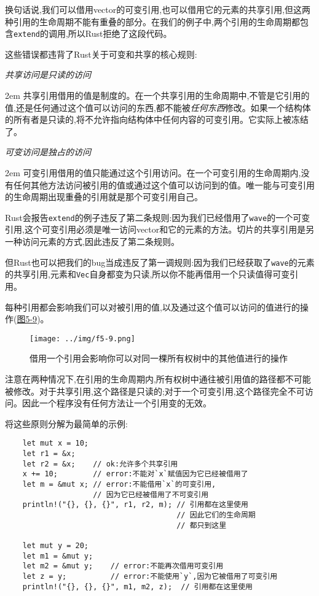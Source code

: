 换句话说,我们可以借用vector的可变引用,也可以借用它的元素的共享引用,但这两种引用的生命周期不能有重叠的部分。在我们的例子中,两个引用的生命周期都包含\texttt{extend}的调用,所以Rust拒绝了这段代码。

这些错误都违背了Rust关于可变和共享的核心规则:

\begin{flushleft}
    \emph{共享访问是只读的访问}
\end{flushleft}

\hangindent 2em
\noindent
共享引用借用的值是制度的。在一个共享引用的生命周期中,不管是它引用的值,还是任何通过这个值可以访问的东西,都不能被\emph{任何东西}修改。如果一个结构体的所有者是只读的,将不允许指向结构体中任何内容的可变引用。它实际上被冻结了。

\begin{flushleft}
    \emph{可变访问是独占的访问}
\end{flushleft}

\hangindent 2em
\noindent
可变引用借用的值只能通过这个引用访问。在一个可变引用的生命周期内,没有任何其他方法访问被引用的值或通过这个值可以访问到的值。唯一能与可变引用的生命周期出现重叠的引用就是那个可变引用自己。

Rust会报告\texttt{extend}的例子违反了第二条规则:因为我们已经借用了\texttt{wave}的一个可变引用,这个可变引用必须是唯一访问vector和它的元素的方法。切片的共享引用是另一种访问元素的方式,因此违反了第二条规则。

但Rust也可以把我们的bug当成违反了第一调规则:因为我们已经获取了\texttt{wave}的元素的共享引用,元素和\texttt{Vec}自身都变为只读,所以你不能再借用一个只读值得可变引用。

每种引用都会影响我们可以对被引用的值,以及通过这个值可以访问的值进行的操作(\hyperref[f5-9]{图5-9})。

\begin{figure}[htbp]
    \centering
    \texttt{[image: ../img/f5-9.png]}
    \caption{借用一个引用会影响你可以对同一棵所有权树中的其他值进行的操作}
    \label{f5-9}
\end{figure}

注意在两种情况下,在引用的生命周期内,所有权树中通往被引用值的路径都不可能被修改。对于共享引用,这个路径是只读的;对于一个可变引用,这个路径完全不可访问。因此一个程序没有任何方法让一个引用变的无效。

将这些原则分解为最简单的示例:
\begin{verbatim}
    let mut x = 10;
    let r1 = &x;
    let r2 = &x;    // ok:允许多个共享引用
    x += 10;        // error:不能对`x`赋值因为它已经被借用了
    let m = &mut x; // error:不能借用`x`的可变引用,
                    // 因为它已经被借用了不可变引用
    println!("{}, {}, {}", r1, r2, m); // 引用都在这里使用
                                       // 因此它们的生命周期
                                       // 都只到这里

    let mut y = 20;
    let m1 = &mut y;
    let m2 = &mut y;    // error:不能再次借用可变引用
    let z = y;          // error:不能使用`y`,因为它被借用了可变引用
    println!("{}, {}, {}", m1, m2, z);  // 引用都在这里使用
\end{verbatim}

